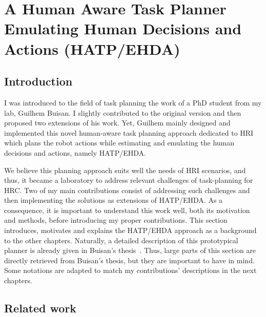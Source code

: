 \ifdefined{}
\else
\setcounter{chapter}{1} %
\dominitoc
\faketableofcontents
\fi

\chapter{A Human Aware Task Planner Emulating Human Decisions and Actions (HATP/EHDA)}
\label{chap:2}
\minitoc

\section{Introduction}

I was introduced to the field of task planning the work of a PhD student from my lab, Guilhem Buisan. I slightly contributed to the original version and then proposed two extensions of his work. Yet, Guilhem mainly designed and implemented this novel human-aware task planning approach dedicated to HRI which plans the robot actions while estimating and emulating the human decisions and actions, namely HATP/EHDA. 

We believe this planning approach suits well the needs of HRI scenarios, and thus, it became a laboratory to address relevant challenges of task-planning for HRC. 
Two of my main contributions consist of addressing such challenges and then implementing the solutions as extensions of HATP/EHDA.   
As a consequence, it is important to understand this work well, both its motivation and methods, before introducing my proper contributions. This section introduces, motivates and explains the HATP/EHDA approach as a background to the other chapters. 
Naturally, a detailed description of this prototypical planner is already given in Buisan's thesis~\cite{thesisBuisan21}. Thus, large parts of this section are directly retrieved from Buisan's thesis, but they are important to have in mind. Some notations are adapted to match my contributions' descriptions in the next chapters. 

\section{Related work}

